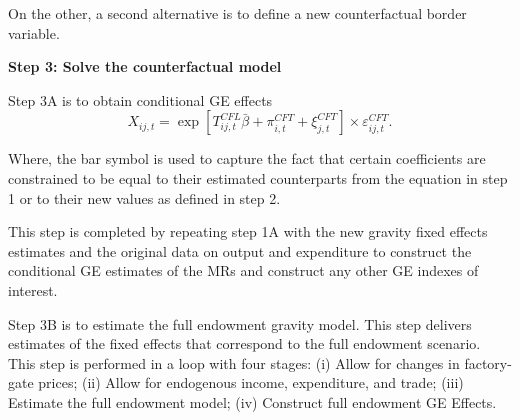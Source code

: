 \documentclass[12pt,reqno,oneside,pdftex]{formato-puc/puctesis} %
\newenvironment{Shaded}{\begin{snugshade}}{\end{snugshade}}
\newcommand{\AttributeTok}[1]{\textcolor[rgb]{0.77,0.63,0.00}{#1}}
\newcommand{\DecValTok}[1]{\textcolor[rgb]{0.00,0.00,0.81}{#1}}
\newcommand{\FunctionTok}[1]{\textcolor[rgb]{0.00,0.00,0.00}{#1}}
\newcommand{\NormalTok}[1]{#1}
\newcommand{\OtherTok}[1]{\textcolor[rgb]{0.56,0.35,0.01}{#1}}
\newcommand{\SpecialCharTok}[1]{\textcolor[rgb]{0.00,0.00,0.00}{#1}}
\newcommand{\StringTok}[1]{\textcolor[rgb]{0.31,0.60,0.02}{#1}}
\begin{document}
On the other, a second alternative is to define a new counterfactual
border variable.

\begin{Shaded}
\end{Shaded}

\textbf{Step 3: Solve the counterfactual model}

Step 3A is to obtain conditional GE effects \begin{equation*}
X_{ij,t} = \exp[T_{ij,t}^{CFL}\bar{\beta} + \pi_{i,t}^{CFT} + \xi_{j,t}^{CFT}] \times \varepsilon_{ij,t}^{CFT}.
\end{equation*}

Where, the bar symbol is used to capture the fact that certain
coefficients are constrained to be equal to their estimated counterparts
from the equation in step 1 or to their new values as defined in step 2.

This step is completed by repeating step 1A with the new gravity fixed
effects estimates and the original data on output and expenditure to
construct the conditional GE estimates of the MRs and construct any
other GE indexes of interest.

Step 3B is to estimate the full endowment gravity model. This step
delivers estimates of the fixed effects that correspond to the full
endowment scenario. This step is performed in a loop with four stages:
(i) Allow for changes in factory-gate prices; (ii) Allow for endogenous
income, expenditure, and trade; (iii) Estimate the full endowment model;
(iv) Construct full endowment GE Effects.
\end{document}
